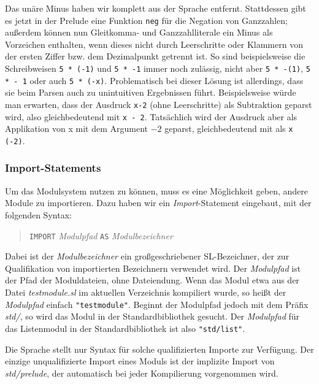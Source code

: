 \documentclass[runningheads]{llncs}
\begin{document}
Das unäre Minus haben wir komplett aus der Sprache entfernt.
Stattdessen gibt es jetzt in der Prelude eine Funktion \verb|neg| für
die Negation von Ganzzahlen; außerdem können nun Gleitkomma- und
Ganzzahlliterale ein Minus als Vorzeichen enthalten, wenn dieses nicht
durch Leerschritte oder Klammern von der ersten Ziffer bzw. dem
Dezimalpunkt getrennt ist.  So sind beispielsweise die Schreibweisen
\verb|5 * (-1)| und \verb|5 * -1| immer noch zulässig, nicht aber
\verb|5 * -(1)|, \verb|5 * - 1| oder auch \verb|5 * (-x)|.
Problematisch bei dieser Lösung ist allerdings, dass sie beim Parsen
auch zu unintuitiven Ergebnissen führt.  Beispielsweise würde man
erwarten, dass der Ausdruck \verb|x-2| (ohne Leerschritte) als
Subtraktion geparst wird, also gleichbedeutend mit \verb|x - 2|.
Tatsächlich wird der Ausdruck aber als Applikation von x mit dem
Argument $-2$ geparst, gleichbedeutend mit als \verb|x (-2)|.

\subsubsection{Import-Statements}

Um das Modulsystem nutzen zu können, muss es eine Möglichkeit geben,
andere Module zu importieren.  Dazu haben wir ein
\emph{Import}-Statement eingebaut, mit der folgenden Syntax:

\begin{quote}
\verb|IMPORT| \emph{Modulpfad} \verb|AS| \emph{Modulbezeichner}
\end{quote}

Dabei ist der \emph{Modulbezeichner} ein großgeschriebener
SL-Bezeichner, der zur Qualifikation von importierten Bezeichnern
verwendet wird.  Der \emph{Modulpfad} ist der Pfad der Moduldateien, ohne
Dateiendung.  Wenn das Modul etwa aus der Datei
\emph{testmodule.sl} im aktuellen Verzeichnis kompiliert wurde, so
heißt der \emph{Modulpfad} einfach \verb|"testmodule"|.  Beginnt der
Modulpfad jedoch mit dem Präfix \emph{std/}, so wird das Modul in der
Standardbibliothek gesucht.  Der \emph{Modulpfad} für das Listenmodul
in der Standardbibliothek ist also \verb|"std/list"|.

Die Sprache stellt nur Syntax für solche qualifizierten Importe zur
Verfügung.  Der einzige unqualifizierte Import eines Moduls ist der
implizite Import von \emph{std/prelude}, der automatisch bei jeder
Kompilierung vorgenommen wird.
\end{document}
